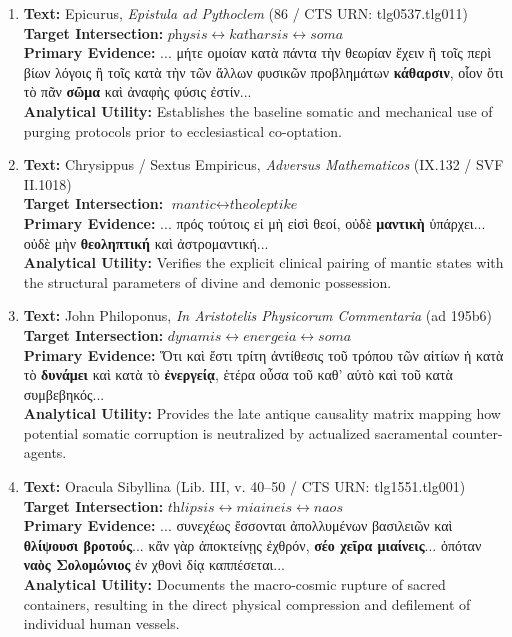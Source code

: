 \documentclass[11pt,twoside,a4paper]{article}
\begin{document}
\begin{enumerate}
    \item \textbf{Text:} Epicurus, \textit{Epistula ad Pythoclem} (86 / CTS URN: tlg0537.tlg011) \\
    \textbf{Target Intersection:} $\textit{physis} \leftrightarrow \textit{katharsis} \leftrightarrow \textit{soma}$ \\
    \textbf{Primary Evidence:} ... μήτε ομοίαν κατὰ πάντα τὴν θεωρίαν ἔχειν ἢ τοῖς περὶ βίων λόγοις ἢ τοῖς κατὰ τὴν τῶν ἄλλων φυσικῶν προβλημάτων \textbf{κάθαρσιν}, οἷον ὅτι τὸ πᾶν \textbf{σῶμα} καὶ ἀναφὴς φύσις ἐστίν... \\
    \textbf{Analytical Utility:} Establishes the baseline somatic and mechanical use of purging protocols prior to ecclesiastical co-optation.
    
    \item \textbf{Text:} Chrysippus / Sextus Empiricus, \textit{Adversus Mathematicos} (IX.132 / SVF II.1018) \\
    \textbf{Target Intersection:} $\textit{mantic} \leftrightarrow \textit{theoleptike}$ \\
    \textbf{Primary Evidence:} ... πρός τούτοις εἰ μὴ εἰσὶ θεοί, οὐδὲ \textbf{μαντικὴ} ὑπάρχει... οὐδὲ μὴν \textbf{θεοληπτική} καὶ ἀστρομαντική... \\
    \textbf{Analytical Utility:} Verifies the explicit clinical pairing of mantic states with the structural parameters of divine and demonic possession.
    
    \item \textbf{Text:} John Philoponus, \textit{In Aristotelis Physicorum Commentaria} (ad 195b6) \\
    \textbf{Target Intersection:} $\textit{dynamis} \leftrightarrow \textit{energeia} \leftrightarrow \textit{soma}$ \\
    \textbf{Primary Evidence:} Ὅτι καὶ ἔστι τρίτη ἀντίθεσις τοῦ τρόπου τῶν αἰτίων ἡ κατὰ τὸ \textbf{δυνάμει} καὶ κατὰ τὸ \textbf{ἐνεργείᾳ}, ἑτέρα οὖσα τοῦ καθ’ αὑτὸ καὶ τοῦ κατὰ συμβεβηκός... \\
    \textbf{Analytical Utility:} Provides the late antique causality matrix mapping how potential somatic corruption is neutralized by actualized sacramental counter-agents.

    \item \textbf{Text:} Oracula Sibyllina (Lib. III, v. 40--50 / CTS URN: tlg1551.tlg001) \\
    \textbf{Target Intersection:} $\textit{thlipsis} \leftrightarrow \textit{miaineis} \leftrightarrow \textit{naos}$ \\
    \textbf{Primary Evidence:} ... συνεχέως ἔσσονται ἀπολλυμένων βασιλειῶν καὶ \textbf{θλίψουσι βροτούς}... κἂν γὰρ ἀποκτείνῃς ἐχθρόν, \textbf{σέο χεῖρα μιαίνεις}... ὁπόταν \textbf{ναὸς Σολομώνιος} ἐν χθονὶ δίᾳ καππέσεται... \\
    \textbf{Analytical Utility:} Documents the macro-cosmic rupture of sacred containers, resulting in the direct physical compression and defilement of individual human vessels.


\end{enumerate}
\end{document}
